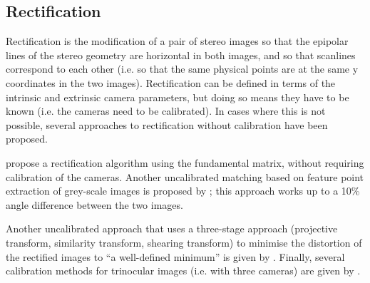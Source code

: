 \subsection{Rectification}
\label{sec:rectification-prior}

Rectification is the modification of a pair of stereo images so that the
epipolar lines of the stereo geometry are horizontal in both images, and so that
scanlines correspond to each other (i.e. so that the same physical points are at
the same y coordinates in the two images). Rectification can be defined in terms
of the intrinsic and extrinsic camera parameters, but doing so means they have
to be known (i.e. the cameras need to be calibrated). In cases where this is not
possible, several approaches to rectification without calibration have been
proposed.

\citet{chen03} propose a rectification algorithm using the fundamental matrix,
without requiring calibration of the cameras. Another uncalibrated matching
based on feature point extraction of grey-scale images is proposed by
\citet{papadimitriou96:_epipol}; this approach works up to a 10\% angle
difference between the two images.

Another uncalibrated approach that uses a three-stage approach (projective
transform, similarity transform, shearing transform) to minimise the distortion
of the rectified images to ``a well-defined minimum'' is given by
\citet{loop99:_comput}. Finally, several calibration methods for trinocular
images (i.e. with three cameras) are given by \citet{sun03:_uncal}.

